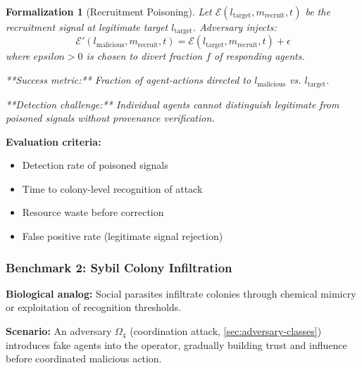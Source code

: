 \documentclass[
]{article}
\providecommand{\tightlist}{%
  \setlength{\itemsep}{0pt}\setlength{\parskip}{0pt}}
\newtheorem{formalization}[theorem]{Formalization}
\begin{document}
\begin{formalization}[Recruitment Poisoning]
\label{form:recruitment-poisoning}
Let $\mathcal{E}(l_{\text{target}}, m_{\text{recruit}}, t)$ be the recruitment signal at legitimate target $l_{\text{target}}$. Adversary injects:
\begin{equation}
\mathcal{E}'(l_{\text{malicious}}, m_{\text{recruit}}, t) = \mathcal{E}(l_{\text{target}}, m_{\text{recruit}}, t) + \epsilon
\label{eq:recruitment-signal-injection}
\end{equation}
where $epsilon > 0$ is chosen to divert fraction $f$ of responding agents.

**Success metric:** Fraction of agent-actions directed to $l_{\text{malicious}}$ vs. $l_{\text{target}}$.

**Detection challenge:** Individual agents cannot distinguish legitimate from poisoned signals without provenance verification.
\end{formalization}

\textbf{Evaluation criteria:}

\begin{itemize}
\tightlist
\item
  Detection rate of poisoned signals
\item
  Time to colony-level recognition of attack
\item
  Resource waste before correction
\item
  False positive rate (legitimate signal rejection)
\end{itemize}

\subsubsection{Benchmark 2: Sybil Colony
Infiltration}\label{sec:benchmark-sybil}

\textbf{Biological analog:} Social parasites infiltrate colonies through
chemical mimicry or exploitation of recognition thresholds.

\textbf{Scenario:} An adversary \(\Omega_4\) (coordination attack,
\cref{sec:adversary-classes}) introduces fake agents into the operator,
gradually building trust and influence before coordinated malicious
action.
\end{document}

